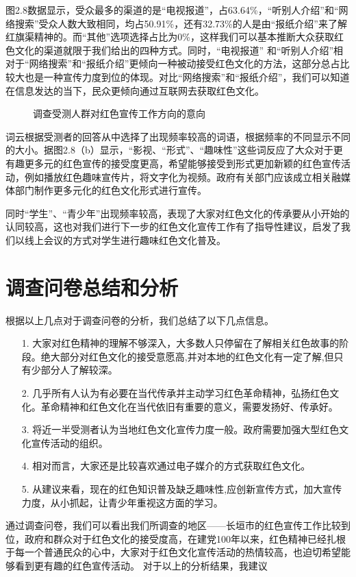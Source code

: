 \documentclass[AutoFakeBold]{LZUThesis}
\begin{document}
图2.8数据显示，受众最多的渠道的是“电视报道”，占63.64\%，“听别人介绍”和“网络搜索”受众人数大致相同，均占50.91\%，还有32.73\%的人是由“报纸介绍”来了解红旗渠精神的。而“其他”选项选择占比为0\%，这样我们可以基本推断大众获取红色文化的渠道就限于我们给出的四种方式。同时，“电视报道” 和“听别人介绍”相对于“网络搜索”和“报纸介绍”更倾向一种被动接受红色文化的方法，这部分总占比较大也是一种宣传力度到位的体现。对比“网络搜索”和“报纸介绍”，我们可以知道在信息发达的当下，民众更倾向通过互联网去获取红色文化。

\begin{figure}[htbp]
    \centering
    \quad
    \caption{调查受测人群对红色宣传工作方向的意向}
\end{figure}

词云根据受测者的回答从中选择了出现频率较高的词语，根据频率的不同显示不同的大小。据图2.8（b）显示，“影视、“形式”、“趣味性”这些词反应了大众对于更有趣更多元的红色宣传的接受度更高，希望能够接受到形式更加新颖的红色宣传活动，例如播放红色趣味宣传片，将文字化为视频。政府有关部门应该成立相关融媒体部门制作更多元化的红色文化形式进行宣传。

同时“学生”、“青少年”出现频率较高，表现了大家对红色文化的传承要从小开始的认同较高，这也对我们进行下一步的红色文化宣传工作有了指导性建议，启发了我们以线上会议的方式对学生进行趣味红色文化普及。
\section{调查问卷总结和分析}
根据以上几点对于调查问卷的分析，我们总结了以下几点信息。
\begin{enumerate}
    \item[1.]大家对红色精神的理解不够深入，大多数人只停留在了解相关红色故事的阶段。绝大部分对红色文化的接受意愿高,并对本地的红色文化有一定了解,但只有少部分人了解较深。
    \item[2.]几乎所有人认为有必要在当代传承并主动学习红色革命精神，弘扬红色文化。革命精神和红色文化在当代依旧有重要的意义，需要发扬好、传承好。
    \item[3.]将近一半受测者认为当地红色文化宣传力度一般。政府需要加强大型红色文化宣传活动的组织。
    \item[4.]相对而言，大家还是比较喜欢通过电子媒介的方式获取红色文化。
    \item[5.]从建议来看，现在的红色知识普及缺乏趣味性,应创新宣传方式，加大宣传力度，从小抓起，让青少年重视这方面的学习。
\end{enumerate}
通过调查问卷，我们可以看出我们所调查的地区——长垣市的红色宣传工作比较到位，政府和群众对于红色文化的接受度高，在建党100年以来，红色精神已经扎根于每一个普通民众的心中，大家对于红色文化宣传活动的热情较高，也迫切希望能够看到更有趣的红色宣传活动。
对于以上的分析结果，我建议
\end{document}
